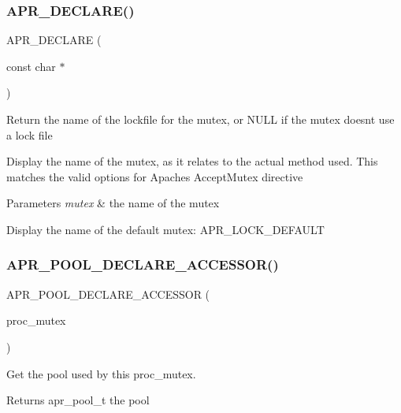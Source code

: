 \subsubsection{\texorpdfstring{A\+P\+R\+\_\+\+D\+E\+C\+L\+A\+R\+E()}{APR\_DECLARE()}\hspace{0.1cm}{\footnotesize\ttfamily [2/2]}}
{\footnotesize\ttfamily A\+P\+R\+\_\+\+D\+E\+C\+L\+A\+RE (\begin{DoxyParamCaption}\item[{const char $\ast$}]{ }\end{DoxyParamCaption})}

Return the name of the lockfile for the mutex, or N\+U\+LL if the mutex doesn\textquotesingle{}t use a lock file

Display the name of the mutex, as it relates to the actual method used. This matches the valid options for Apache\textquotesingle{}s Accept\+Mutex directive 
\begin{DoxyParams}{Parameters}
{\em mutex} & the name of the mutex\\
\hline
\end{DoxyParams}
Display the name of the default mutex\+: A\+P\+R\+\_\+\+L\+O\+C\+K\+\_\+\+D\+E\+F\+A\+U\+LT \mbox{\label{group__apr__proc__mutex_gacfbfc453323a4f81b12d537f9d0a3df3}} 
\subsubsection{\texorpdfstring{A\+P\+R\+\_\+\+P\+O\+O\+L\+\_\+\+D\+E\+C\+L\+A\+R\+E\+\_\+\+A\+C\+C\+E\+S\+S\+O\+R()}{APR\_POOL\_DECLARE\_ACCESSOR()}}
{\footnotesize\ttfamily A\+P\+R\+\_\+\+P\+O\+O\+L\+\_\+\+D\+E\+C\+L\+A\+R\+E\+\_\+\+A\+C\+C\+E\+S\+S\+OR (\begin{DoxyParamCaption}\item[{proc\+\_\+mutex}]{ }\end{DoxyParamCaption})}

Get the pool used by this proc\+\_\+mutex. \begin{DoxyReturn}{Returns}
apr\+\_\+pool\+\_\+t the pool 
\end{DoxyReturn}
